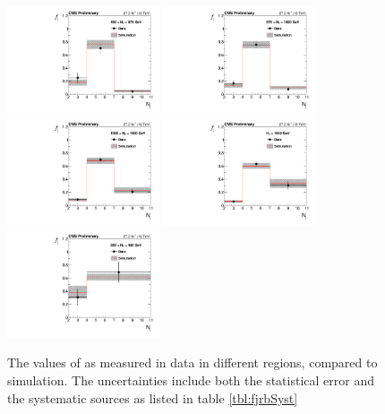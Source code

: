 \begin{figure}
	\centering
	\includegraphics[width=0.4\textwidth]{backgrounds/figs/f_jets_HT450to575_j2toInf_b0toInf}
	\includegraphics[width=0.4\textwidth]{backgrounds/figs/f_jets_HT575to1000_j2toInf_b0toInf}
	\includegraphics[width=0.4\textwidth]{backgrounds/figs/f_jets_HT1000to1500_j2toInf_b0toInf}
	\includegraphics[width=0.4\textwidth]{backgrounds/figs/f_jets_HT1500toInf_j2toInf_b0toInf.pdf}
	\includegraphics[width=0.4\textwidth]{backgrounds/figs/f_jets_HT250to450_j2toInf_b0toInf}
	\renewcommand{\baselinestretch}{1.0}
	\caption[The values of \fj as measured in data in different \HT regions, compared to simulation.]{The values of \fj as measured in data in different \HT regions, compared to simulation. The uncertainties include both the statistical error and the systematic sources as listed in table \ref{tbl:fjrbSyst}}
	\label{fig:fj}
\end{figure}
